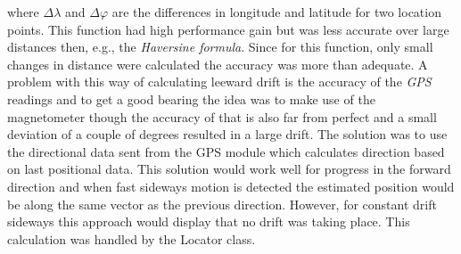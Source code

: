 where $\Delta\lambda$ and $\Delta\varphi$ are the differences in longitude and latitude for two location points. This function had high performance gain but was less accurate over large distances then, e.g., the \textit{Haversine formula}\cite{haversine}. Since for this function, only small changes in distance were calculated the accuracy was more than adequate. A problem with this way of calculating leeward drift is the accuracy of the \textit{GPS} readings and to get a good bearing the idea was to make use of the magnetometer though the accuracy of that is also far from perfect and a small deviation of a couple of degrees resulted in a large drift. The solution was to use the directional data sent from the GPS module which calculates direction based on last positional data. This solution would work well for progress in the forward direction and when fast sideways motion is detected the estimated position would be along the same vector as the previous direction. However, for constant drift sideways this approach would display that no drift was taking place. This calculation was handled by the Locator class.

























